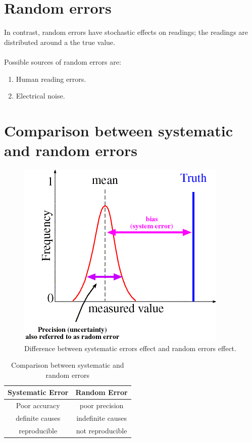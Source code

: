 \documentclass[a4paper,11pt,dvipsnames]{book}
\begin{document}
\section*{Random errors}

In contrast, random errors have stochastic effects on readings; the readings are distributed around a the true value.  \\ \\  
Possible sources of random errors are:
\begin{enumerate}
\item Human reading errors.
\item Electrical noise.
\end{enumerate}

\section*{Comparison between systematic and random errors}
\begin{figure}[h!]\label{fig:uncertinity}
\centering
  \includegraphics[width=0.8\linewidth]{uncertinity}
  \caption{Difference between systematic errors effect and random errors effect.} 
\end{figure}

\begin{table}
\begin{tabular}{|c|c|}
\hline 
Systematic Error & Random Error \\ 
\hline 
Poor accuracy & poor precision \\ 
\hline 
definite causes & indefinite causes \\ 
\hline 
reproducible & not reproducible \\ 
\hline 
\end{tabular} 
\caption{Comparison between systematic and random errors}
\end{table}
\end{document}
